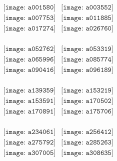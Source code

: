 \documentclass{article}
\begin{document}
\begin{figure}[H]
\begin{center}$
\begin{array}{cc}
\texttt{[image: a001580]}&\texttt{[image: a003552]}\\\texttt{[image: a007753]}&\texttt{[image: a011885]}\\\texttt{[image: a017274]}&\texttt{[image: a026760]}\\
\end{array}$
\end{center}
\end{figure}

\begin{figure}[H]
\begin{center}$
\begin{array}{cc}
\texttt{[image: a052762]}&\texttt{[image: a053319]}\\\texttt{[image: a065996]}&\texttt{[image: a085774]}\\\texttt{[image: a090416]}&\texttt{[image: a096189]}\\
\end{array}$
\end{center}
\end{figure}

\begin{figure}[H]
\begin{center}$
\begin{array}{cc}
\texttt{[image: a139359]}&\texttt{[image: a153219]}\\\texttt{[image: a153591]}&\texttt{[image: a170502]}\\\texttt{[image: a170891]}&\texttt{[image: a175706]}\\
\end{array}$
\end{center}
\end{figure}

\begin{figure}[H]
\begin{center}$
\begin{array}{cc}
\texttt{[image: a234061]}&\texttt{[image: a256412]}\\\texttt{[image: a275792]}&\texttt{[image: a285263]}\\\texttt{[image: a307005]}&\texttt{[image: a308635]}\\
\end{array}$
\end{center}
\end{figure}
\end{document}
